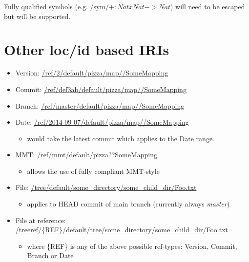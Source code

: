 \documentclass[a4paper,11pt,DIV=25]{scrartcl}
\begin{document}
Fully qualified symbols (e.g. /sym/$+:NatxNat->Nat$) will need to be escaped
but will be supported.

\section{Other loc/id based IRIs}

\begin{itemize}
  \item Version: \url{/ref/2/default/pizza/map//SomeMapping}
  \item Commit: \url{/ref/def3ab/default/pizza/map//SomeMapping}
  \item Branch: \url{/ref/master/default/pizza/map//SomeMapping}
  \item Date: \url{/ref/2014-09-07/default/pizza/map//SomeMapping}
    \begin{itemize}
      \item would take the latest commit which applies to the Date range.
    \end{itemize}
  \item MMT: \url{/ref/mmt/default/pizza??SomeMapping}
    \begin{itemize}
      \item allows the use of fully compliant MMT-style
    \end{itemize}
  \item File: \url{/tree/default/some_directory/some_child_dir/Foo.txt}
    \begin{itemize}
      \item applies to HEAD commit of main branch (currently always \textit{master})
    \end{itemize}
  \item File at reference: \url{/treeref/{REF}/default/tree/some_directory/some_child_dir/Foo.txt}
    \begin{itemize}
      \item where \{REF\} is any of the above possible ref-types: Version, Commit, Branch or Date
    \end{itemize}
\end{itemize}
\end{document}
